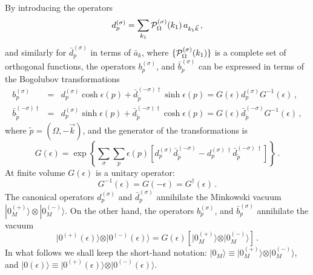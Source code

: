 \noindent By introducing the operators \cite{TAK}
\begin{equation}\label{d-op}
  d^{(\sigma)}_p=\sum_{k_1} {\cal
  P}_\Omega^{(\sigma)}(k_1)\, a_{k_1{\vec k}}\,,
\end{equation}
and similarly for ${\bar d}^{(\sigma)}_p$ in terms of ${\bar
a}_k$, where $\{{\cal P}_\Omega^{(\sigma)}(k_1)\}$ is a complete
set of orthogonal functions, the operators $b_p^{(\sigma)}$, and
${\bar b}_p^{(\sigma)}$ can be expressed in terms of the Bogolubov
transformations \cite{birrell,TAK}
 \begin{eqnarray}
 b_p^{(\sigma)} & = & d_p^{(\sigma)} \cosh \epsilon (p)
       + {\bar d}_{\tilde p}^{(-\sigma) \dagger} \sinh \epsilon
       (p) = G(\epsilon)d_p^{(\sigma)}G^{-1}
 (\epsilon)\,, \label{b1} \\
 {\bar b}_{\tilde p}^{(-\sigma) \dagger}  & = &
 d_p^{(\sigma)} \sinh \epsilon (p)
 + {\bar d}_{\tilde p}^{(-\sigma) \dagger} \cosh \epsilon
 (p) = G(\epsilon)\bar{d}_{\tilde p}^{(-\sigma)}G^{-1}
 (\epsilon) \,, \label{b2}
 \end{eqnarray}
where $\tilde{p} = (\Omega, -\vec{k})$, and the generator of the
transformations is
 \begin{equation}\label{eq16}
 G(\epsilon) = \exp \left\{  \sum_{\sigma} \sum_p \epsilon(p)
 \left[ d_p^{(\sigma)}\bar{d}_{\tilde p}^{(-\sigma)} -
 d_p^{(\sigma)\,\dagger}\bar{d}_{\tilde
 p}^{(-\sigma)\,\dagger} \right] \right\} \,{.}
 \end{equation}
At finite volume $G(\epsilon)$ is a unitary operator:
 \[
 G^{-1}(\epsilon)=G(-\epsilon)=G^{\dagger}(\epsilon)\,.
 \]
The canonical operators $d^{(\sigma)}_p$ and ${\bar
d}^{(\sigma)}_p$ annihilate the Minkowski vacuum
$|0^{(+)}_M\rangle \otimes |0^{(-)}_M\rangle$. On the other hand,
the operators $b_p^{(\sigma)}$, and ${\bar b}_p^{(\sigma)}$
annihilate the vacuum
\begin{equation}\label{vacb}
  \vert 0^{(+)} (\epsilon) \rangle \otimes  \vert 0^{(-)} (\epsilon) \rangle
  = G (\epsilon) \left[\vert 0_M^{(+)} \rangle \otimes  \vert 0_M^{(-)} \rangle \right] \,.
\end{equation}
In what follows we shall keep the short-hand notation: $\vert 0_M
\rangle \equiv \vert 0_M^{(+)} \rangle \otimes \vert 0_M^{(-)}
\rangle$, and $\vert 0 (\epsilon) \rangle \equiv \vert 0^{(+)}
(\epsilon) \rangle \otimes \vert 0^{(-)} (\epsilon) \rangle$.

